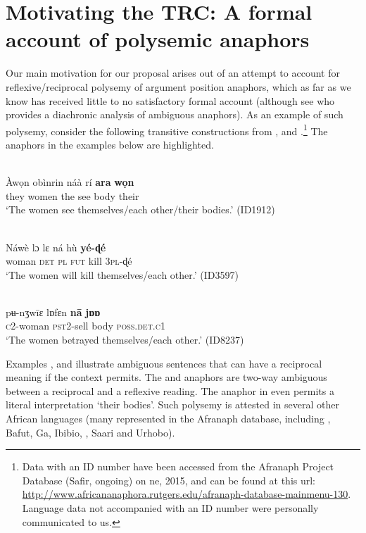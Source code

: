 \documentclass[output=paper]{langsci/langscibook}
\begin{document}
\section{Motivating the TRC: A formal account of polysemic anaphors}\label{sec:safir:2}



Our main motivation for our proposal arises out of an attempt to account for reflexive/reciprocal polysemy of argument position anaphors, which as far as we know has received little to no satisfactory formal account (although see \citealt{Heine1999} who provides a diachronic analysis of ambiguous anaphors). As an example of such polysemy, consider the following transitive constructions from ,  and .\footnote{Data with an ID number have been accessed from the Afranaph Project Database (Safir, ongoing) on ne, 2015, and can be found at this url: \url{http://www.africananaphora.rutgers.edu/afranaph-database-mainmenu-130}. Language data not accompanied with an ID number were personally communicated to us.} The anaphors in the examples below are highlighted.



\ea\label{ex:safir:2}
 \\
\gll Àwọn     obìnrin   náà  rí   \textbf{ara}   \textbf{wọn} \\
they     women   the   see   body   their\\
\glt  ‘The women see themselves/each other/their bodies.’ {(ID1912)}
\z


\ea\label{ex:safir:3}
 \\
\gll Náwè     lɔ  lɛ  ná  hù  \textbf{yé-ɖé} \\
woman    \textsc{det}  \textsc{pl}  \textsc{fut}  kill  \textsc{3pl}-ɖé \\
\glt ‘The women will kill themselves/each other.’ (ID3597) 
\z


\ea\label{ex:safir:4}
 \\
\gll pʉ-nʒwīɛ   lɒfɛn     \textbf{nā}   \textbf{jɒɒ} \\
\textsc{c}{2-woman}   {\textsc{pst2}}-sell   body   \textsc{poss.det.c1}\\
\glt ‘The women betrayed themselves/each other.’ {(ID8237)} 
\z


Examples ,  and  illustrate ambiguous sentences that can have a reciprocal meaning if the context permits. The  and  anaphors are two-way ambiguous between a reciprocal and a reflexive reading. The  anaphor in  even permits a literal interpretation ‘their bodies’. Such polysemy is attested in several other African languages (many represented in the Afranaph database, including , Bafut, Ga, Ibibio, , Saari and Urhobo).
\end{document}
